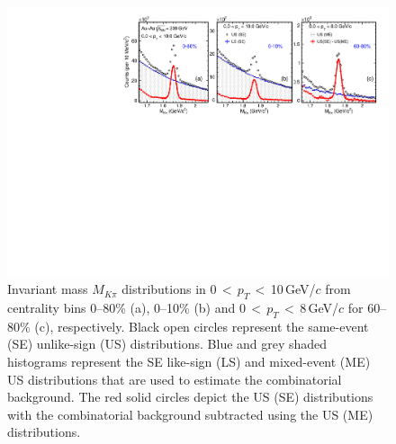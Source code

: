 \documentclass[%
 reprint,	
 amsmath,amssymb,
 aps,
 prc,
]{revtex4-1}
\begin{document}
\begin{figure}
\centering
\includegraphics[width=1.0\textwidth]{fig/signal_0_8_10GeV.pdf}
\caption{Invariant mass $M_{K\pi}$ distributions in 0\,$<$\,$p_{T}$\,$<$\,10\,GeV/$c$ from centrality bins 0--80\% (a), 0--10\% (b) and 0\,$<$\,$p_{T}$\,$<$\,8\,GeV/$c$ for 60--80\% (c), respectively. Black open circles represent the same-event (SE) unlike-sign (US) distributions. Blue and grey shaded histograms represent the SE like-sign (LS) and mixed-event (ME) US distributions that are used to estimate the combinatorial background. The red solid circles depict the US (SE) distributions with the combinatorial background subtracted using the US (ME) distributions.%
}
\label{fig:signal_0} 
\end{figure}
\end{document}
